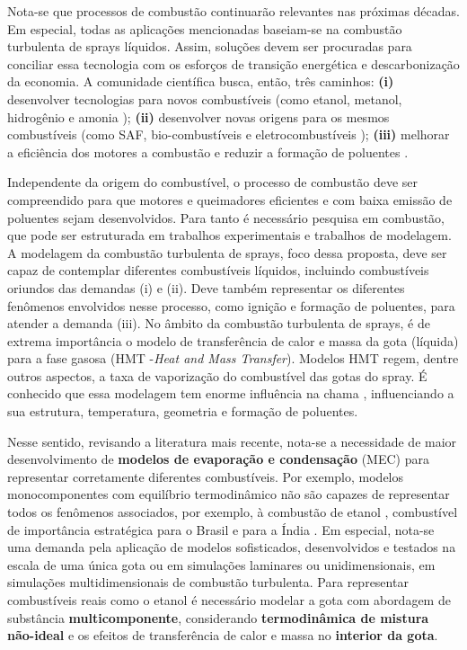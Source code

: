 Nota-se que processos de combustão continuarão relevantes nas próximas décadas.
Em especial, todas as aplicações mencionadas baseiam-se na combustão turbulenta de sprays líquidos.
Assim, soluções devem ser procuradas para conciliar essa tecnologia com os esforços de transição energética e descarbonização da economia.
A comunidade científica busca, então, três caminhos: \textbf{(i)} desenvolver tecnologias para novos combustíveis (como  etanol, metanol, hidrogênio e amonia \cite{FAPESP_etanol_1,VerhelstS2019,TeohY2023,ElbazA2022}); \textbf{(ii)} desenvolver novas origens para os mesmos combustíveis (como SAF, bio-combustíveis e eletrocombustíveis \cite{BenJames-SAF,BergthorsonJ2015,WestbrookC2019,PalysM2022}); \textbf{(iii)} melhorar a eficiência dos motores a combustão e reduzir a formação de poluentes \cite{MasriA2021}.

Independente da origem do combustível, o processo de combustão deve ser compreendido para que motores e queimadores eficientes e com baixa emissão de poluentes sejam desenvolvidos.
Para tanto é necessário pesquisa em combustão, que pode ser estruturada em trabalhos experimentais e trabalhos de modelagem.
A modelagem da combustão turbulenta de sprays, foco dessa proposta, deve ser capaz de contemplar diferentes combustíveis líquidos, incluindo combustíveis oriundos das demandas (i) e (ii).
Deve também representar os diferentes fenômenos envolvidos nesse processo, como ignição e formação de poluentes, para atender a demanda (iii).
No âmbito da combustão turbulenta de sprays, é de extrema importância o modelo de transferência de calor e massa da gota (líquida) para a fase gasosa (HMT -\emph{Heat and Mass Transfer}).
Modelos HMT regem, dentre outros aspectos, a taxa de vaporização do combustível das gotas do spray.
É conhecido que essa modelagem tem enorme influência na chama \cite{JennyB2012}, influenciando a sua estrutura, temperatura, geometria e formação de poluentes.


Nesse sentido, revisando a literatura mais recente, nota-se a necessidade de maior desenvolvimento de \textbf{modelos de evaporação e condensação} (MEC) para representar corretamente diferentes combustíveis.
Por exemplo, modelos monocomponentes com equilíbrio termodinâmico não são capazes de representar todos os fenômenos associados, por exemplo, à combustão de etanol \cite{SacomanoF2024CF}, combustível de importância estratégica para o Brasil e para a Índia \cite{etanol-BNDES,etanol-India}.
Em especial, nota-se uma demanda pela aplicação de modelos sofisticados, desenvolvidos e testados na escala de uma única gota ou em simulações
laminares ou unidimensionais, em simulações multidimensionais de combustão turbulenta.
Para representar combustíveis reais como o etanol é necessário modelar a gota com abordagem de substância \textbf{multicomponente}, considerando \textbf{termodinâmica de mistura não-ideal} e os efeitos de transferência de calor e massa no \textbf{interior da gota}.

